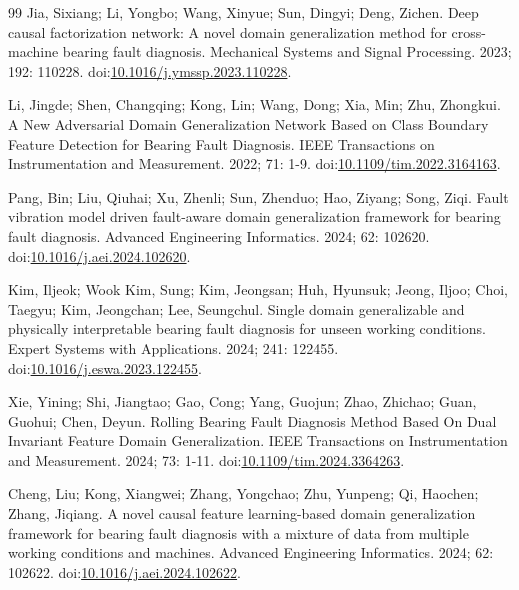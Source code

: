 \documentclass[11pt]{article}
\begin{document}
\begin{thebibliography}{99}
 Jia, Sixiang; Li, Yongbo; Wang, Xinyue; Sun, Dingyi; Deng, Zichen. Deep causal factorization network: A novel domain generalization method for cross-machine bearing fault diagnosis. Mechanical Systems and Signal Processing. 2023; 192: 110228. doi:\url{10.1016/j.ymssp.2023.110228}.

 Li, Jingde; Shen, Changqing; Kong, Lin; Wang, Dong; Xia, Min; Zhu, Zhongkui. A New Adversarial Domain Generalization Network Based on Class Boundary Feature Detection for Bearing Fault Diagnosis. IEEE Transactions on Instrumentation and Measurement. 2022; 71: 1-9. doi:\url{10.1109/tim.2022.3164163}.

 Pang, Bin; Liu, Qiuhai; Xu, Zhenli; Sun, Zhenduo; Hao, Ziyang; Song, Ziqi. Fault vibration model driven fault-aware domain generalization framework for bearing fault diagnosis. Advanced Engineering Informatics. 2024; 62: 102620. doi:\url{10.1016/j.aei.2024.102620}.

 Kim, Iljeok; Wook Kim, Sung; Kim, Jeongsan; Huh, Hyunsuk; Jeong, Iljoo; Choi, Taegyu; Kim, Jeongchan; Lee, Seungchul. Single domain generalizable and physically interpretable bearing fault diagnosis for unseen working conditions. Expert Systems with Applications. 2024; 241: 122455. doi:\url{10.1016/j.eswa.2023.122455}.

 Xie, Yining; Shi, Jiangtao; Gao, Cong; Yang, Guojun; Zhao, Zhichao; Guan, Guohui; Chen, Deyun. Rolling Bearing Fault Diagnosis Method Based On Dual Invariant Feature Domain Generalization. IEEE Transactions on Instrumentation and Measurement. 2024; 73: 1-11. doi:\url{10.1109/tim.2024.3364263}.

 Cheng, Liu; Kong, Xiangwei; Zhang, Yongchao; Zhu, Yunpeng; Qi, Haochen; Zhang, Jiqiang. A novel causal feature learning-based domain generalization framework for bearing fault diagnosis with a mixture of data from multiple working conditions and machines. Advanced Engineering Informatics. 2024; 62: 102622. doi:\url{10.1016/j.aei.2024.102622}.
\end{thebibliography}
\end{document}
